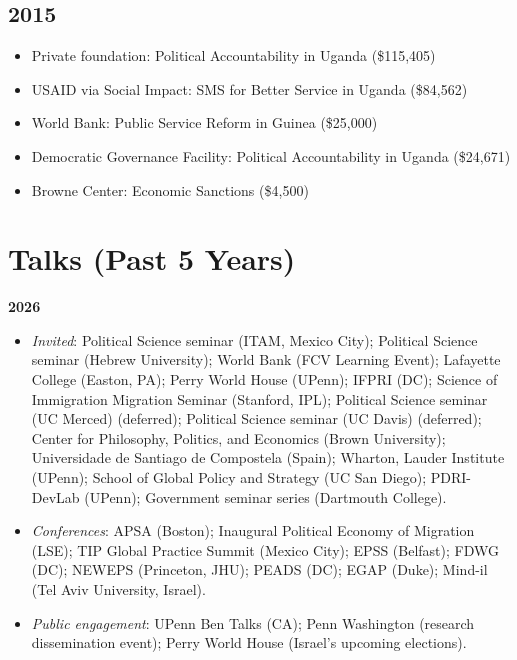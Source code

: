 \documentclass[10pt,a4paper]{article}
\begin{document}
\subsection*{2015}
\begin{itemize}[leftmargin=1em, itemsep=1pt, topsep=2pt, label=\textcolor{secondary}{$\bullet$}]
\item Private foundation: Political Accountability in Uganda (\$115,405)
\item USAID via Social Impact: SMS for Better Service in Uganda (\$84,562)
\item World Bank: Public Service Reform in Guinea (\$25,000)
\item Democratic Governance Facility: Political Accountability in Uganda (\$24,671)
\item Browne Center: Economic Sanctions (\$4,500)
\end{itemize}

\section{Talks (Past 5 Years)}

\textbf{2026}
\begin{itemize}[leftmargin=1em, itemsep=0pt, topsep=2pt, label={}]
\item \textit{Invited}: Political Science seminar (ITAM, Mexico City); Political Science seminar (Hebrew University); World Bank (FCV Learning Event); Lafayette College (Easton, PA); Perry World House (UPenn); IFPRI (DC); Science of Immigration Migration Seminar (Stanford, IPL); Political Science seminar (UC Merced) (deferred); Political Science seminar (UC Davis) (deferred); Center for Philosophy, Politics, and Economics (Brown University); Universidade de Santiago de Compostela (Spain); Wharton, Lauder Institute (UPenn); School of Global Policy and Strategy (UC San Diego); PDRI-DevLab (UPenn); Government seminar series (Dartmouth College).
\item \textit{Conferences}: APSA (Boston); Inaugural Political Economy of Migration (LSE); TIP Global Practice Summit (Mexico City); EPSS (Belfast); FDWG (DC); NEWEPS (Princeton, JHU); PEADS (DC); EGAP (Duke); Mind-il (Tel Aviv University, Israel).
\item \textit{Public engagement}: UPenn Ben Talks (CA); Penn Washington (research dissemination event); Perry World House (Israel's upcoming elections).
\end{itemize}
\end{document}
